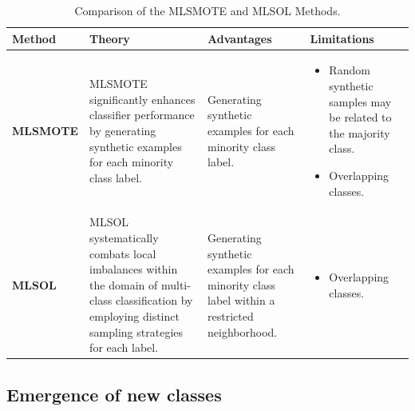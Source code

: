 \begin{table}[!ht]

    \centering
    \caption{Comparison of the MLSMOTE and MLSOL Methods.}
    \label{table:imbalanced}

    \small %
    \renewcommand{\arraystretch}{1} %
    \setlength{\tabcolsep}{4pt} %
    \setlength{\arrayrulewidth}{0.15mm}

    \begin{tabularx}{\textwidth}{|>{\centering\arraybackslash\bfseries}p{2cm}|
                                       >{\raggedright\arraybackslash}X|
                                       >{\raggedright\arraybackslash}X|
                                       >{\raggedright\arraybackslash}X|}
    \hline
    \textbf{Method} & \textbf{Theory} & \textbf{Advantages} & \textbf{Limitations} \\ 
    \hline
    \textbf{MLSMOTE \cite{charte2015mlsmote}} & 
    MLSMOTE significantly enhances classifier performance by generating synthetic examples for each minority class label. & 
    Generating synthetic examples for each minority class label. & 
    \begin{itemize}[leftmargin=*]
        \item Random synthetic samples may be related to the majority class.
        \item Overlapping classes.
    \end{itemize} \\ 
    \hline
    \textbf{MLSOL \cite{liu2022multi}} & 
    MLSOL systematically combats local imbalances within the domain of multi-class classification by employing distinct sampling strategies for each label. & 
    Generating synthetic examples for each minority class label within a restricted neighborhood. & 
    \begin{itemize}[leftmargin=*]
        \item Overlapping classes.
    \end{itemize} \\
    \hline
    \end{tabularx}
    \end{table}

\subsection{Emergence of new classes}
\label{sec:3_6_2_related_work_emergence}


